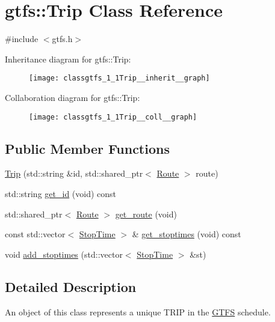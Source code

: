 \hypertarget{classgtfs_1_1Trip}{}\section{gtfs\+:\+:Trip Class Reference}
\label{classgtfs_1_1Trip}


{\ttfamily \#include $<$gtfs.\+h$>$}



Inheritance diagram for gtfs\+:\+:Trip\+:
\nopagebreak
\begin{figure}[H]
\begin{center}
\leavevmode
\texttt{[image: classgtfs\_1\_1Trip\_\_inherit\_\_graph]}
\end{center}
\end{figure}


Collaboration diagram for gtfs\+:\+:Trip\+:
\nopagebreak
\begin{figure}[H]
\begin{center}
\leavevmode
\texttt{[image: classgtfs\_1\_1Trip\_\_coll\_\_graph]}
\end{center}
\end{figure}
\subsection*{Public Member Functions}
\begin{DoxyCompactItemize}
\item 
\hyperlink{classgtfs_1_1Trip_a3014ee32fdb5abd550ad20088c91aae6}{Trip} (std\+::string \&id, std\+::shared\+\_\+ptr$<$ \hyperlink{classgtfs_1_1Route}{Route} $>$ route)
\item 
std\+::string \hyperlink{classgtfs_1_1Trip_aa782ff9cd28d6d405fe246747282a898}{get\+\_\+id} (void) const 
\item 
std\+::shared\+\_\+ptr$<$ \hyperlink{classgtfs_1_1Route}{Route} $>$ \hyperlink{classgtfs_1_1Trip_a2b6cc135946d7e7db7bb35951987e35c}{get\+\_\+route} (void)
\item 
const std\+::vector$<$ \hyperlink{structgtfs_1_1StopTime}{Stop\+Time} $>$ \& \hyperlink{classgtfs_1_1Trip_a4ad4f03b8e8baccc768582ea3d213bed}{get\+\_\+stoptimes} (void) const 
\item 
void \hyperlink{classgtfs_1_1Trip_a2a756ff7d8e17f4eaa520f6314b5bb07}{add\+\_\+stoptimes} (std\+::vector$<$ \hyperlink{structgtfs_1_1StopTime}{Stop\+Time} $>$ \&st)
\end{DoxyCompactItemize}


\subsection{Detailed Description}
An object of this class represents a unique T\+R\+IP in the \hyperlink{classgtfs_1_1GTFS}{G\+T\+FS} schedule.

